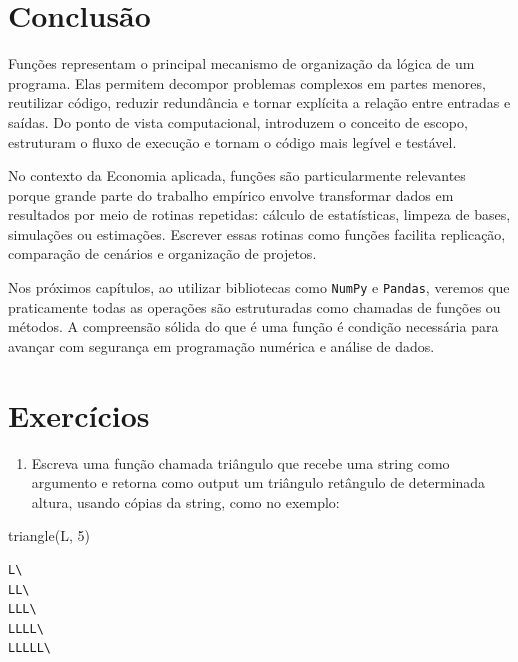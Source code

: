 \documentclass[
  brazilian,
  letterpaper,
  DIV=11,
  numbers=noendperiod]{scrreprt}
\newenvironment{Shaded}{\begin{snugshade}}{\end{snugshade}}
\newcommand{\DecValTok}[1]{\textcolor[rgb]{0.68,0.00,0.00}{#1}}
\newcommand{\NormalTok}[1]{\textcolor[rgb]{0.00,0.23,0.31}{#1}}
\newcommand{\StringTok}[1]{\textcolor[rgb]{0.13,0.47,0.30}{#1}}
\providecommand{\tightlist}{%
  \setlength{\itemsep}{0pt}\setlength{\parskip}{0pt}}
\begin{document}
\section{Conclusão}\label{conclusuxe3o-5}

Funções representam o principal mecanismo de organização da lógica de um
programa. Elas permitem decompor problemas complexos em partes menores,
reutilizar código, reduzir redundância e tornar explícita a relação
entre entradas e saídas. Do ponto de vista computacional, introduzem o
conceito de escopo, estruturam o fluxo de execução e tornam o código
mais legível e testável.

No contexto da Economia aplicada, funções são particularmente relevantes
porque grande parte do trabalho empírico envolve transformar dados em
resultados por meio de rotinas repetidas: cálculo de estatísticas,
limpeza de bases, simulações ou estimações. Escrever essas rotinas como
funções facilita replicação, comparação de cenários e organização de
projetos.

Nos próximos capítulos, ao utilizar bibliotecas como \texttt{NumPy} e
\texttt{Pandas}, veremos que praticamente todas as operações são
estruturadas como chamadas de funções ou métodos. A compreensão sólida
do que é uma função é condição necessária para avançar com segurança em
programação numérica e análise de dados.

\section{Exercícios}\label{exercuxedcios-5}

\begin{enumerate}
\def\labelenumi{\arabic{enumi}.}
\tightlist
\item
  Escreva uma função chamada triângulo que recebe uma string como
  argumento e retorna como output um triângulo retângulo de determinada
  altura, usando cópias da string, como no exemplo:
\end{enumerate}

\begin{Shaded}
\begin{Highlighting}[]
\NormalTok{triangle(}\StringTok{\textquotesingle{}L\textquotesingle{}}\NormalTok{, }\DecValTok{5}\NormalTok{)}
\end{Highlighting}
\end{Shaded}

\begin{verbatim}
L\
LL\
LLL\
LLLL\
LLLLL\
\end{verbatim}
\end{document}
